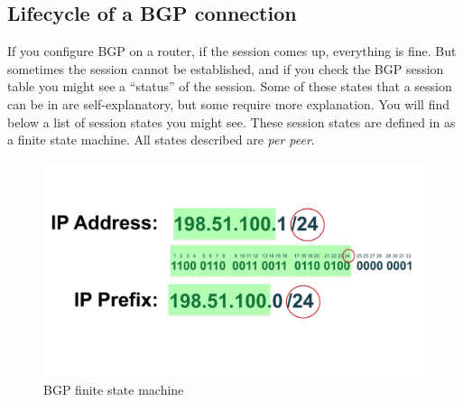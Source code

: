 \subsection{Lifecycle of a BGP connection}
If you configure BGP on a router, if the session comes up, everything is fine. But sometimes the session cannot be established, and if you check the BGP session table you might see a ``status'' of the session. Some of these states that a session can be in are self-explanatory, but some require more explanation. You will find below a list of session states you might see. These session states are defined in  as a finite state machine. All states described are \emph{per peer}.

\begin{figure}
  \centering
  \includegraphics[width=\linewidth,page=15]{img/Drawings.pdf}
  \caption{BGP finite state machine}
  \label{fig:bgpfsm}
\end{figure}

